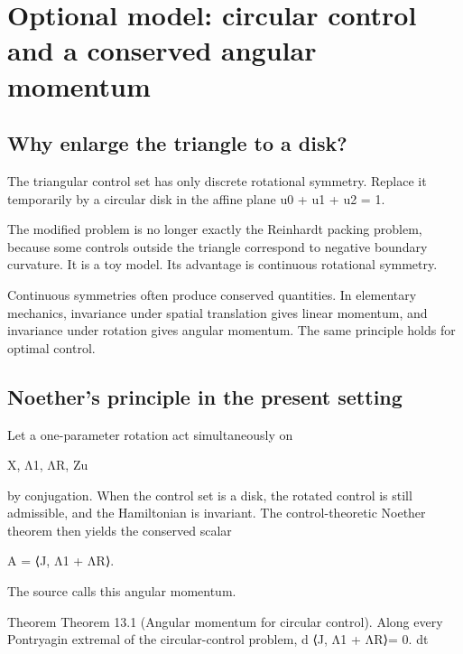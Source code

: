 \chapter{Optional model: circular control and a conserved angular momentum}
\section{Why enlarge the triangle to a disk?}

The triangular control set has only discrete rotational symmetry. Replace it temporarily by a circular disk in the affine plane u0 + u1 + u2 = 1.


The modified problem is no longer exactly the Reinhardt packing problem, because some controls outside the triangle correspond to negative boundary curvature. It is a toy model. Its advantage is continuous rotational symmetry.


Continuous symmetries often produce conserved quantities. In elementary mechanics, invariance under spatial translation gives linear momentum, and invariance under rotation gives angular momentum. The same principle holds for optimal control.


\section{Noether’s principle in the present setting}

Let a one-parameter rotation act simultaneously on


\begin{displaytext}
X, Λ1, ΛR, Zu
\end{displaytext}

by conjugation. When the control set is a disk, the rotated control is still admissible, and the Hamiltonian is invariant. The control-theoretic Noether theorem then yields the conserved scalar


\begin{displaytext}
A = ⟨J, Λ1 + ΛR⟩.
\end{displaytext}

The source calls this angular momentum.


\begin{statementbox}{Theorem}
Theorem 13.1 (Angular momentum for circular control). Along every Pontryagin extremal of the circular-control problem, d ⟨J, Λ1 + ΛR⟩= 0. dt
\end{statementbox}

